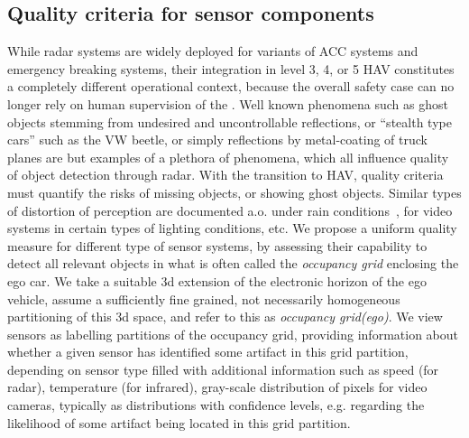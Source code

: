 \subsection{Quality criteria for sensor components}\label{subsec:quality}
While radar systems are widely deployed for variants of ACC systems and emergency breaking systems, their integration in level 3, 4, or 5 HAV constitutes a completely different operational context, because the overall safety case can no longer rely on human supervision of the . Well known phenomena such as ghost objects stemming from undesired and uncontrollable reflections, or \enquote{stealth type cars} such as the VW beetle, or simply reflections by metal-coating of truck planes are but examples of a plethora of phenomena, which all influence quality of object detection through radar. With the transition to HAV, quality criteria must quantify the risks of missing objects, or showing ghost objects. Similar types of distortion of perception are documented a.o. under rain conditions~\cite{Cord14}, for video systems in certain types of lighting conditions, etc. We propose a uniform quality measure for different type of sensor systems, by assessing their capability to detect all relevant objects in what is often called the \emph{occupancy grid} enclosing the ego car. We take a suitable 3d extension of the electronic horizon of the ego vehicle, assume a sufficiently fine grained, not necessarily homogeneous partitioning of this 3d space, and refer to this as \emph{occupancy grid(ego)}. We view sensors as labelling partitions of the occupancy grid, providing information about whether a given sensor has identified some artifact in this grid partition, depending on sensor type filled with additional information such as speed (for radar), temperature (for infrared), gray-scale distribution of pixels for video cameras, \del{\ldots}typically as distributions with confidence levels, e.g. regarding the likelihood of some artifact being located in this grid partition. 

